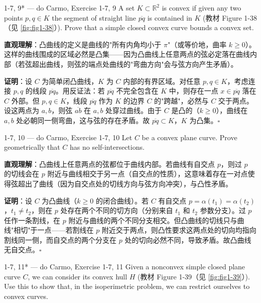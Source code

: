 \begin{exercise}{1-7, 9* — do Carmo, Exercise 1-7, 9}
A set $K \subset \mathbb{R}^2$ is convex if given any two points $p, q \in K$ the segment of straight line $\overline{pq}$ is contained in $K$ (教材 Figure 1-38（见 \cref{fig:fig1-38}）). Prove that a simple closed convex curve bounds a convex set.
\end{exercise}

\begin{solution}
\textbf{直观理解}：凸曲线的定义是曲线的"所有内角均小于 $\pi$"（或等价地，曲率 $k \geq 0$）。这样的曲线围成的区域必然是凸集——因为凸曲线上任意两点的弦必定落在曲线内部（若弦超出曲线，则弦的端点处曲线的"弯曲方向"会与弦方向产生矛盾）。

\textbf{证明}：设 $C$ 为简单闭凸曲线，$K$ 为 $C$ 内部的有界区域。对任意 $p, q \in K$，考虑连接 $p, q$ 的线段 $\overline{pq}$。用反证法：若 $\overline{pq}$ 不完全包含在 $K$ 中，则存在一点 $x \in \overline{pq}$ 落在 $C$ 外部。但 $p, q \in K$，线段 $\overline{pq}$ 作为 $K$ 的边界 $C$ 的"跨越"，必然与 $C$ 交于两点。设这两点为 $a, b$，则弦 $\overline{ab}$ 在 $a, b$ 处穿过曲线。由于 $C$ 是凸的（$k \geq 0$），曲线在 $a, b$ 处必朝同一侧弯曲，这与弦的存在矛盾。故 $\overline{pq} \subset K$，$K$ 为凸集。$\square$
\end{solution}

\begin{exercise}{1-7, 10 — do Carmo, Exercise 1-7, 10}
Let $C$ be a convex plane curve. Prove geometrically that $C$ has no self-intersections.
\end{exercise}

\begin{solution}
\textbf{直观理解}：凸曲线上任意两点的弦都位于曲线内部。若曲线有自交点 $p$，则过 $p$ 的切线会在 $p$ 附近与曲线相交于另一点（自交点的性质），这意味着存在一对点使得弦超出了曲线（因为自交点处的切线方向与弦方向冲突），与凸性矛盾。

\textbf{证明}：设 $C$ 为凸曲线（$k \geq 0$ 的闭合曲线）。若 $C$ 有自交点 $p = \alpha(t_1) = \alpha(t_2)$，$t_1 \neq t_2$，则在 $p$ 处存在两个不同的切方向（分别来自 $t_1$ 和 $t_2$ 参数分支）。过 $p$ 任作一条割线，在 $p$ 附近与曲线的两个不同分支相交。但凸曲线的切线只与曲线"相切"于一点——若割线在 $p$ 附近交于两点，则凸性要求这两点处的切向均指向割线同一侧，而自交点的两个分支在 $p$ 处的切向必然不同，导致矛盾。故凸曲线无自交点。$\square$
\end{solution}

\begin{exercise}{1-7, 11* — do Carmo, Exercise 1-7, 11}
Given a nonconvex simple closed plane curve $C$, we can consider its convex hull $H$ (教材 Figure 1-39（见 \cref{fig:fig1-39}）). Use this to show that, in the isoperimetric problem, we can restrict ourselves to convex curves.
\end{exercise}

